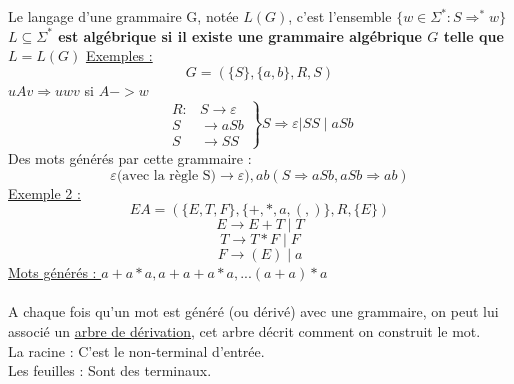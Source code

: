 \documentclass{article}
\begin{document}
    Le langage d'une grammaire G, notée $L(G)$, c'est l'ensemble $\{w \in \Sigma^* : S \Longrightarrow^* w\}$ \\
    \textbf{$L \subseteq \Sigma^*$ est algébrique si il existe une grammaire algébrique $G$ telle que $L=L(G)$}
    \newpage
    \underline{Exemples :} \\
    \begin{equation*}
        G=(\{S\},\{a,b\},R,S)
    \end{equation*}
    $uAv \Longrightarrow uwv$ si $A -> w$ \\
    \begin{equation*}
        \left.\begin{array}{rl}
            R: & S \rightarrow \varepsilon \\
            S & \rightarrow a S b \\
            S & \rightarrow S S
            \end{array}\right\} S \Rightarrow \varepsilon | SS  \mid  a S b
    \end{equation*}
    Des mots générés par cette grammaire : \\ 
    \begin{equation*}
        \varepsilon \text{(avec la règle S)} \rightarrow \varepsilon), ab (S \Longrightarrow aSb, aSb  \Longrightarrow ab)
    \end{equation*}
    \underline{Exemple 2 : }
    \begin{equation*}
        EA=(\{E,T,F\}, \{+,*,a,(,)\},R,\{E\}) 
    \end{equation*}
    \begin{equation*}
        E \rightarrow E+T \mid T 
    \end{equation*}
    \begin{equation*}
        T \rightarrow T*F \mid F
    \end{equation*}
    \begin{equation*}
        F \rightarrow (E) \mid a 
    \end{equation*}
    \underline{Mots générés : } $a+a*a, a+a+a*a, ... (a+a)*a$ \\
    \\
    A chaque fois qu'un mot est généré (ou dérivé) avec une grammaire, on peut lui associé un \underline{arbre de dérivation}, cet arbre décrit comment on construit le mot. \\
    La racine : C'est le non-terminal d'entrée. \\
    Les feuilles : Sont des terminaux. \\ 
\end{document}
